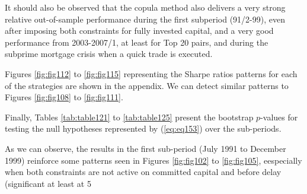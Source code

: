 \documentclass[a4paper]{article}
\begin{document}
	It should also be observed that the copula method also delivers a very strong relative out-of-sample performance during the first subperiod (91/2-99), even after imposing both constraints for fully invested capital, and a very good performance from 2003-2007/1, at least for Top 20 pairs, and during the subprime mortgage crisis when a quick trade is executed.
	
	Figures \ref{fig:fig112} to \ref{fig:fig115} representing the Sharpe ratios patterns for each of the strategies are shown in the appendix. We can detect similar patterns to Figures \ref{fig:fig108} to \ref{fig:fig111}.
	
	
%	
%	
%
	
	
	Finally, Tables \ref{tab:table121} to \ref{tab:table125} present the bootstrap $p$-values for testing the null hypotheses represented by (\ref{eq:eq153}) over the sub-periods.
	
	As we can observe, the results in the first sub-period (July 1991 to December 1999) reinforce some patterns seen in Figures \ref{fig:fig102} to \ref{fig:fig105}, eespecially when both constraints are not active on committed capital and before delay (significant at least at 5\\%
	
\end{document}
